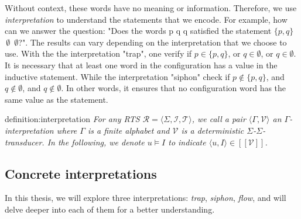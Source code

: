 Without context, these words have no meaning or information.
Therefore, we use \textit{interpretation} to understand the statements that we encode.
For example, how can we answer the question: "Does the words p q q satisfied the statement $\lbrace p,q \rbrace$  $\,\emptyset$ $\,\emptyset$?".
The results can vary depending on the interpretation that we choose to use.
With the the interpretation "trap", one verify if 
$p \in \lbrace p,q \rbrace$, or $q \in \emptyset$, or $q \in \emptyset$.
It is necessary that at least one word in the configuration has a value in the inductive statement.
While the interpretation "siphon" check if
$p \notin \lbrace p,q \rbrace$, and $q \notin \emptyset$, and $q \notin \emptyset$.
In other words, it ensures that no configuration word has the same value as the statement.

\begin{theo}[Interpretation]{definition:interpretation}
    \textit{
        For any RTS $\mathcal{R} = \langle \Sigma, \mathcal{I}, \mathcal{T} \rangle$, we call 
        a pair $\langle \Gamma, \mathcal{V} \rangle$ an $\Gamma$-\textit{interpretation}
        where $\Gamma$ is a finite alphabet and $\mathcal{V}$ is a deterministic $\Sigma$-$\Sigma$-\textit{transducer}.
        In the following, we denote $ u \models I $ to indicate $ \langle u, I \rangle \in [[\mathcal{V}]]$.
     }
\end{theo}

\subsection*{Concrete interpretations}
In this thesis, we will explore three interpretations: \textit{trap}, \textit{siphon}, \textit{flow}, 
and will delve deeper into each of them for a better understanding.

